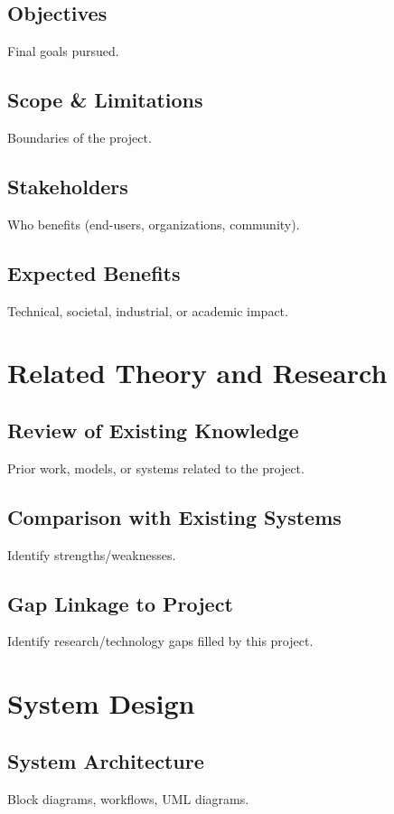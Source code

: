\documentclass[12pt]{article}
\begin{document}
\subsection{Objectives}
Final goals pursued.

\subsection{Scope \& Limitations}
Boundaries of the project.

\subsection{Stakeholders}
Who benefits (end-users, organizations, community).

\subsection{Expected Benefits}
Technical, societal, industrial, or academic impact.

\section{Related Theory and Research}

\subsection{Review of Existing Knowledge}
Prior work, models, or systems related to the project.

\subsection{Comparison with Existing Systems}
Identify strengths/weaknesses.

\subsection{Gap Linkage to Project}
Identify research/technology gaps filled by this project.

\section{System Design}

\subsection{System Architecture}
Block diagrams, workflows, UML diagrams.
\end{document}
